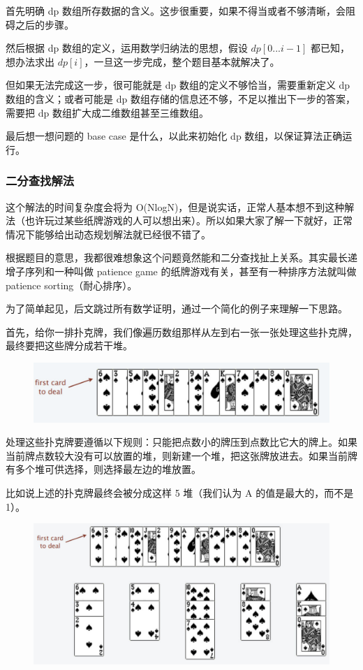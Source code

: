 \documentclass[12pt]{article}
\begin{document}
首先明确 dp 数组所存数据的含义。这步很重要，如果不得当或者不够清晰，会阻碍之后的步骤。

然后根据 dp 数组的定义，运用数学归纳法的思想，假设 $dp[0...i-1]$ 都已知，想办法求出 $dp[i]$，一旦这一步完成，整个题目基本就解决了。

但如果无法完成这一步，很可能就是 dp 数组的定义不够恰当，需要重新定义 dp 数组的含义；或者可能是 dp 数组存储的信息还不够，不足以推出下一步的答案，需要把 dp 数组扩大成二维数组甚至三维数组。

最后想一想问题的 base case 是什么，以此来初始化 dp 数组，以保证算法正确运行。

\subsubsection{二分查找解法}
这个解法的时间复杂度会将为 O(NlogN)，但是说实话，正常人基本想不到这种解法（也许玩过某些纸牌游戏的人可以想出来）。所以如果大家了解一下就好，正常情况下能够给出动态规划解法就已经很不错了。

根据题目的意思，我都很难想象这个问题竟然能和二分查找扯上关系。其实最长递增子序列和一种叫做 patience game 的纸牌游戏有关，甚至有一种排序方法就叫做 patience sorting（耐心排序）。

为了简单起见，后文跳过所有数学证明，通过一个简化的例子来理解一下思路。

首先，给你一排扑克牌，我们像遍历数组那样从左到右一张一张处理这些扑克牌，最终要把这些牌分成若干堆。
\begin{figure}[H]
    \centering
    \includegraphics[width=1\textwidth]{fig/Dynamic_Programming_Longest_Increasing Subsequence_6.png}
\end{figure}

处理这些扑克牌要遵循以下规则：只能把点数小的牌压到点数比它大的牌上。如果当前牌点数较大没有可以放置的堆，则新建一个堆，把这张牌放进去。如果当前牌有多个堆可供选择，则选择最左边的堆放置。

比如说上述的扑克牌最终会被分成这样 5 堆（我们认为 A 的值是最大的，而不是 1）。
\begin{figure}[H]
    \centering
    \includegraphics[width=1\textwidth]{fig/Dynamic_Programming_Longest_Increasing Subsequence_7.png}
\end{figure}
\end{document}
